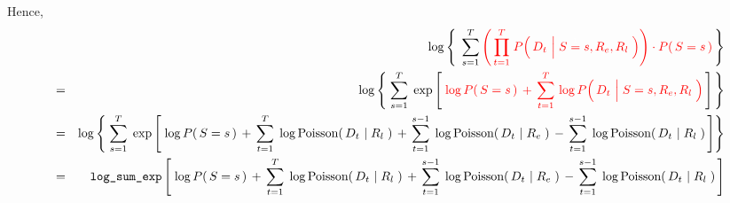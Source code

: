 \noindent
Hence,
\begin{eqnarray*}
&&
	\log\left\{\;\,
	\overset{T}{\underset{s=1}{\sum}}\,
	{\color{red}
		\left(\,
			\overset{T}{\underset{t=1}{\prod}}\;
			P\!\left(\,D_{t} \,\left\vert\; S\overset{{\color{white}1}}{=}s,R_{e},R_{l}\right.\,\right)
			\right)
		\cdot
		P\!\left(\,S=s\,\right)
	}
	\,\right\}
\\
& = &
	\log\left\{\;
	\overset{T}{\underset{s=1}{\sum}}\;
	\exp\left[\;{\color{red}
			\log P\!\left(\,S=s\,\right)
			\, + \,
			\overset{T}{\underset{t=1}{\sum}}\,
				\log P\!\left(\,D_{t} \,\left\vert\; S\overset{{\color{white}1}}{=}s,R_{e},R_{l}\right.\,\right)
		}\,\right]
	\,\right\}
\\
&=&
	\log\left\{\;
	\overset{T}{\underset{s=1}{\sum}}\;
	\exp\left[\;
			\log P\!\left(\,S=s\,\right)
			\,+\,
			\overset{T}{\underset{t=1}{\sum}}\;
			\log\textnormal{Poisson}\!\left(\,D_{t} \,\left\vert\; R_{l}\right.\,\right)
			\,+\,
			\overset{s-1}{\underset{t=1}{\sum}}\;
			\log\textnormal{Poisson}\!\left(\,D_{t} \,\left\vert\; R_{e}\right.\,\right)
			\,-\,
			\overset{s-1}{\underset{t=1}{\sum}}\;
			\log\textnormal{Poisson}\!\left(\,D_{t} \,\left\vert\; R_{l}\right.\,\right)
		\,\right]
	\right\}
\\
&=&
	\texttt{log\_sum\_exp}
	\left[\;
		\log P\!\left(\,S=s\,\right)
		\,+\,
		\overset{T}{\underset{t=1}{\sum}}\;
		\log\textnormal{Poisson}\!\left(\,D_{t} \,\left\vert\; R_{l}\right.\,\right)
		\,+\,
		\overset{s-1}{\underset{t=1}{\sum}}\;
		\log\textnormal{Poisson}\!\left(\,D_{t} \,\left\vert\; R_{e}\right.\,\right)
		\,-\,
		\overset{s-1}{\underset{t=1}{\sum}}\;
		\log\textnormal{Poisson}\!\left(\,D_{t} \,\left\vert\; R_{l}\right.\,\right)
		\,\right]
\end{eqnarray*}



